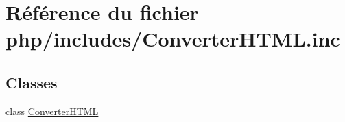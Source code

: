 \hypertarget{_converter_h_t_m_l_8inc}{}\section{Référence du fichier php/includes/\+Converter\+H\+T\+ML.inc}
\label{_converter_h_t_m_l_8inc}
\subsection*{Classes}
\begin{DoxyCompactItemize}
\item 
class \hyperlink{class_converter_h_t_m_l}{Converter\+H\+T\+ML}
\end{DoxyCompactItemize}
